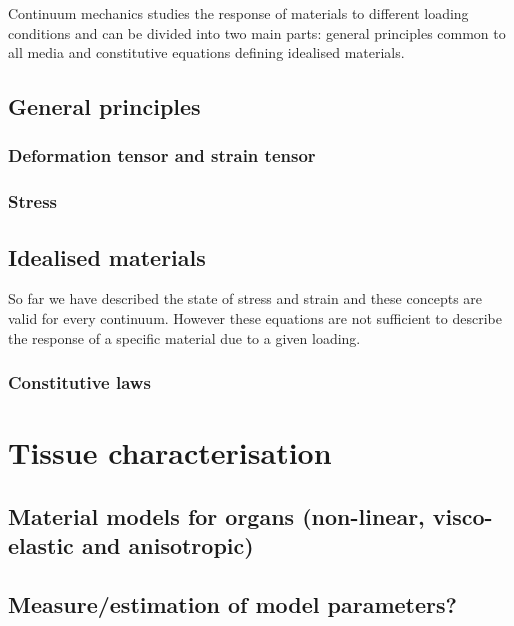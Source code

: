 Continuum mechanics studies the response of materials to different loading conditions and can be divided into two main parts: general principles common to all media and constitutive equations defining idealised materials. 

\subsection{General principles}
\subsubsection{Deformation tensor and strain tensor}
\subsubsection{Stress}

\subsection{Idealised materials}
So far we have described the state of stress and strain and these concepts are valid for every continuum. However these equations are not sufficient to describe the response of a specific material due to a given loading.
\subsubsection{Constitutive laws}

		
		
\section{Tissue characterisation}
	\subsection{Material models for organs (non-linear, visco-elastic and anisotropic)}
	\subsection{Measure/estimation of model parameters?}